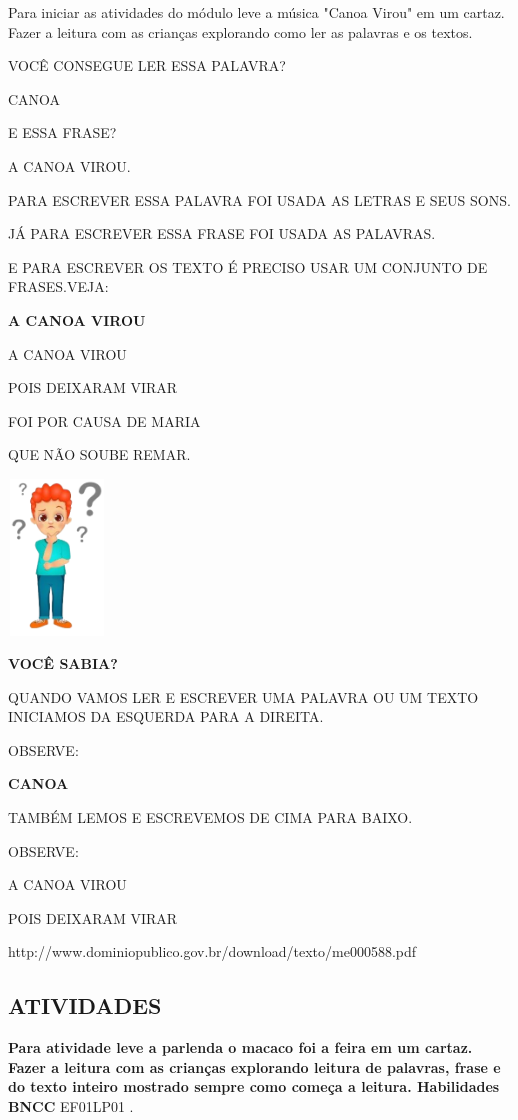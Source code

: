 \protect\hypertarget{_heading=h.4d34og8}{}{}Para iniciar as atividades
do módulo leve a música "Canoa Virou" em um cartaz. Fazer a leitura com as
crianças explorando como ler as palavras e os textos. 

VOCÊ CONSEGUE LER ESSA PALAVRA?

CANOA

E ESSA FRASE?

A CANOA VIROU.

PARA ESCREVER ESSA PALAVRA FOI USADA AS LETRAS E SEUS SONS.

JÁ PARA ESCREVER ESSA FRASE FOI USADA AS PALAVRAS.

E PARA ESCREVER OS TEXTO É PRECISO USAR UM CONJUNTO DE FRASES.VEJA:

\textbf{A CANOA VIROU}

A CANOA VIROU

POIS DEIXARAM VIRAR

FOI POR CAUSA DE MARIA

QUE NÃO SOUBE REMAR.

\includegraphics[width=1.02083in,height=1.63125in]{media/image85.jpg}

\protect\hypertarget{_heading=h.2s8eyo1}{}{}\textbf{VOCÊ SABIA?}

QUANDO VAMOS LER E ESCREVER UMA PALAVRA OU UM TEXTO INICIAMOS DA
ESQUERDA PARA A DIREITA.

OBSERVE:

\textbf{CANOA}

TAMBÉM LEMOS E ESCREVEMOS DE CIMA PARA BAIXO.

OBSERVE:

A CANOA VIROU

POIS DEIXARAM VIRAR

http://www.dominiopublico.gov.br/download/texto/me000588.pdf

\subsection{ATIVIDADES}\label{atividades-1}

\textbf{Para atividade leve a parlenda o macaco foi a feira em um
cartaz. Fazer a leitura com as crianças explorando leitura de palavras,
frase e do texto inteiro mostrado sempre como começa a leitura.
Habilidades BNCC} EF01LP01 .

